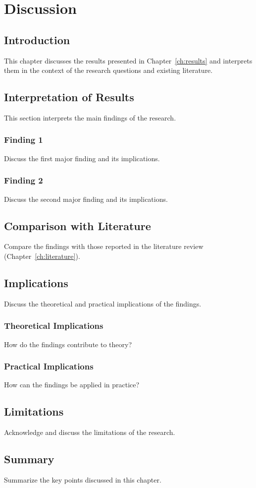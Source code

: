 \chapter{Discussion}
\label{ch:discussion}

\section{Introduction}
This chapter discusses the results presented in Chapter~\ref{ch:results} and interprets them in the context of the research questions and existing literature.

\section{Interpretation of Results}
This section interprets the main findings of the research.

\subsection{Finding 1}
Discuss the first major finding and its implications.

\subsection{Finding 2}
Discuss the second major finding and its implications.

\section{Comparison with Literature}
Compare the findings with those reported in the literature review (Chapter~\ref{ch:literature}).

\section{Implications}
Discuss the theoretical and practical implications of the findings.

\subsection{Theoretical Implications}
How do the findings contribute to theory?

\subsection{Practical Implications}
How can the findings be applied in practice?

\section{Limitations}
Acknowledge and discuss the limitations of the research.

\section{Summary}
Summarize the key points discussed in this chapter.
